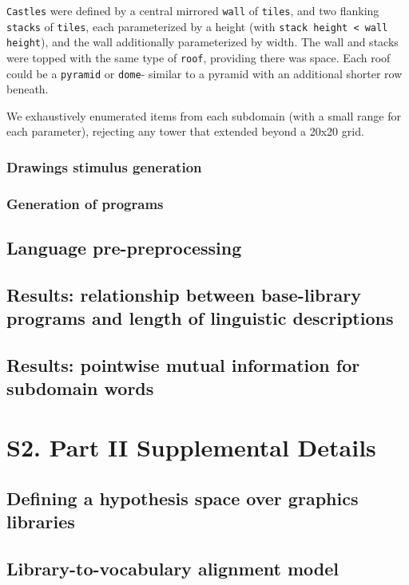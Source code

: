 \documentclass[10pt,letterpaper]{article}
\begin{document}
\texttt{Castles} were defined by a central mirrored \texttt{wall} of \texttt{tiles}, and two flanking \texttt{stacks} of \texttt{tiles}, each parameterized by a height (with \texttt{stack height < wall height}), and the wall additionally parameterized by width. The wall and stacks were topped with the same type of \texttt{roof}, providing there was space. Each roof could be a \texttt{pyramid} or \texttt{dome}- similar to a pyramid with an additional shorter row beneath.

We exhaustively enumerated items from each subdomain (with a small range for each parameter), rejecting any tower that extended beyond a 20x20 grid.


\subsubsection{Drawings stimulus generation}

\subsubsection{Generation of programs}

\subsection{Language pre-preprocessing}

\subsection{Results: relationship between base-library programs and length of linguistic descriptions} 

\subsection{Results: pointwise mutual information for subdomain words} 


\section{S2. Part II Supplemental Details} \label{sec:s1_part_ii}

\subsection{Defining a hypothesis space over graphics libraries}

\subsection{Library-to-vocabulary alignment model}




\setlength{\bibleftmargin}{.125in}
\setlength{\bibindent}{-\bibleftmargin}


\end{document}
